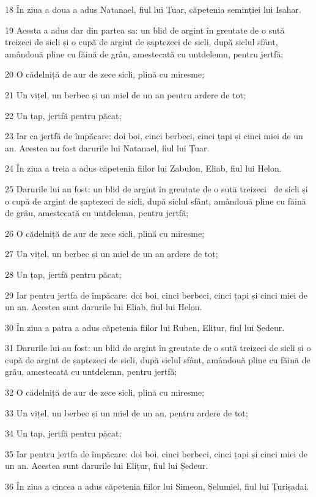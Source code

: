 \par 18 În ziua a doua a adus Natanael, fiul lui Țuar, căpetenia seminției lui Isahar.
\par 19 Acesta a adus dar din partea sa: un blid de argint în greutate de o sută treizeci de sicli și o cupă de argint de șaptezeci de sicli, după siclul sfânt, amândouă pline cu făină de grâu, amestecată cu untdelemn, pentru jertfă;
\par 20 O cădelniță de aur de zece sicli, plină cu miresme;
\par 21 Un vițel, un berbec și un miel de un an pentru ardere de tot;
\par 22 Un țap, jertfă pentru păcat;
\par 23 Iar ca jertfă de împăcare: doi boi, cinci berbeci, cinci țapi și cinci miei de un an. Acestea au fost darurile lui Natanael, fiul lui Țuar.
\par 24 În ziua a treia a adus căpetenia fiilor lui Zabulon, Eliab, fiul lui Helon.
\par 25 Darurile lui au fost: un blid de argint în greutate de o sută treizeci  de sicli și o cupă de argint de șaptezeci de sicli, după siclul sfânt, amândouă pline cu făină de grâu, amestecată cu untdelemn, pentru jertfă;
\par 26 O cădelniță de aur de zece sicli, plină cu miresme;
\par 27 Un vițel, un berbec și un miel de un an ardere de tot;
\par 28 Un țap, jertfă pentru păcat;
\par 29 Iar pentru jertfa de împăcare: doi boi, cinci berbeci, cinci țapi și cinci miei de un an. Acestea sunt darurile lui Eliab, fiul lui Helon.
\par 30 În ziua a patra a adus căpetenia fiilor lui Ruben, Elițur, fiul lui Ședeur.
\par 31 Darurile lui au fost: un blid de argint în greutate de o sută treizeci de sicli și o cupă de argint de șaptezeci de sicli, după siclul sfânt, amândouă pline cu făină de grâu, amestecată cu untdelemn, pentru jertfă;
\par 32 O cădelniță de aur de zece sicli, plină cu miresme;
\par 33 Un vițel, un berbec și un miel de un an, pentru ardere de tot;
\par 34 Un țap, jertfă pentru păcat;
\par 35 Iar pentru jertfa de împăcare: doi boi, cinci berbeci, cinci țapi și cinci miei de un an. Acestea sunt darurile lui Elițur, fiul lui Ședeur.
\par 36 În ziua a cincea a adus căpetenia fiilor lui Simeon, Șelumiel, fiul lui Țurișadai.
